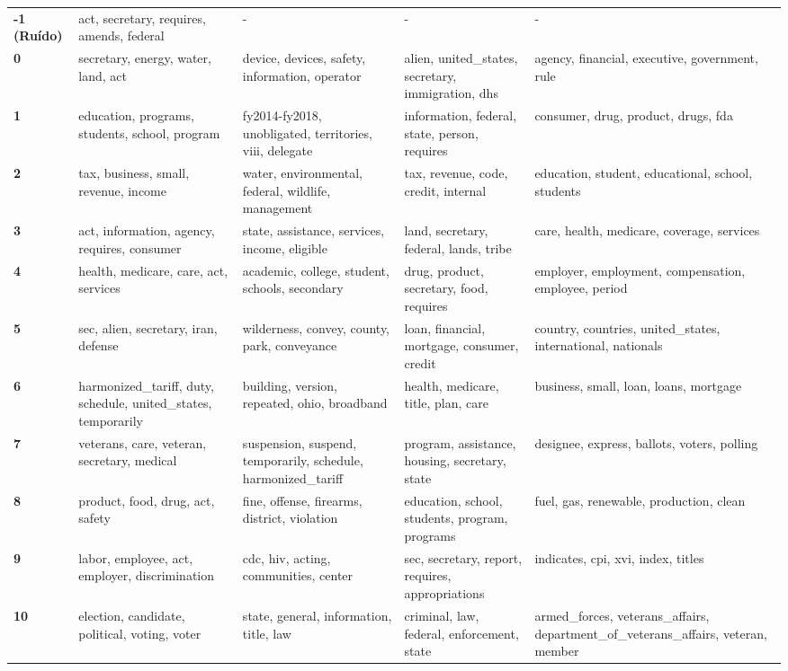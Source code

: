 \begin{xltabular}{\textwidth}{@{}l >{\RaggedRight\arraybackslash}X >{\RaggedRight\arraybackslash}X >{\RaggedRight\arraybackslash}X >{\RaggedRight\arraybackslash}X@{}}
    \textbf{-1 (Ruído)} & act, secretary, requires, amends, federal & - & - & - \\
    \textbf{0} & secretary, energy, water, land, act & device, devices, safety, information, operator & alien, united\_states, secretary, immigration, dhs & agency, financial, executive, government, rule \\
    \textbf{1} & education, programs, students, school, program & fy2014-fy2018, unobligated, territories, viii, delegate & information, federal, state, person, requires & consumer, drug, product, drugs, fda \\
    \textbf{2} & tax, business, small, revenue, income & water, environmental, federal, wildlife, management & tax, revenue, code, credit, internal & education, student, educational, school, students \\
    \textbf{3} & act, information, agency, requires, consumer & state, assistance, services, income, eligible & land, secretary, federal, lands, tribe & care, health, medicare, coverage, services \\
    \textbf{4} & health, medicare, care, act, services & academic, college, student, schools, secondary & drug, product, secretary, food, requires & employer, employment, compensation, employee, period \\
    \textbf{5} & sec, alien, secretary, iran, defense & wilderness, convey, county, park, conveyance & loan, financial, mortgage, consumer, credit & country, countries, united\_states, international, nationals \\
    \textbf{6} & harmonized\_tariff, duty, schedule, united\_states, temporarily & building, version, repeated, ohio, broadband & health, medicare, title, plan, care & business, small, loan, loans, mortgage \\
    \textbf{7} & veterans, care, veteran, secretary, medical & suspension, suspend, temporarily, schedule, harmonized\_tariff & program, assistance, housing, secretary, state & designee, express, ballots, voters, polling \\
    \textbf{8} & product, food, drug, act, safety & fine, offense, firearms, district, violation & education, school, students, program, programs & fuel, gas, renewable, production, clean \\
    \textbf{9} & labor, employee, act, employer, discrimination & cdc, hiv, acting, communities, center & sec, secretary, report, requires, appropriations & indicates, cpi, xvi, index, titles \\
    \textbf{10} & election, candidate, political, voting, voter & state, general, information, title, law & criminal, law, federal, enforcement, state & armed\_forces, veterans\_affairs, department\_of\_veterans\_affairs, veteran, member \\

\end{xltabular}
